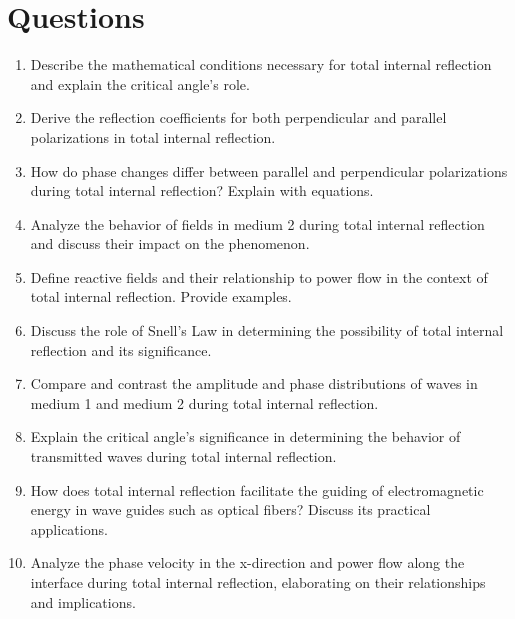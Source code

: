 \section*{Questions}
\begin{enumerate}
    \item Describe the mathematical conditions necessary for total internal reflection and explain the critical angle's role.
    \item Derive the reflection coefficients for both perpendicular and parallel polarizations in total internal reflection.
    \item How do phase changes differ between parallel and perpendicular polarizations during total internal reflection? Explain with equations.
    \item Analyze the behavior of fields in medium 2 during total internal reflection and discuss their impact on the phenomenon.
    \item Define reactive fields and their relationship to power flow in the context of total internal reflection. Provide examples.
    \item Discuss the role of Snell's Law in determining the possibility of total internal reflection and its significance.
    \item Compare and contrast the amplitude and phase distributions of waves in medium 1 and medium 2 during total internal reflection.
    \item Explain the critical angle's significance in determining the behavior of transmitted waves during total internal reflection.
    \item How does total internal reflection facilitate the guiding of electromagnetic energy in wave guides such as optical fibers? Discuss its practical applications.
    \item Analyze the phase velocity in the x-direction and power flow along the interface during total internal reflection, elaborating on their relationships and implications.
\end{enumerate}

